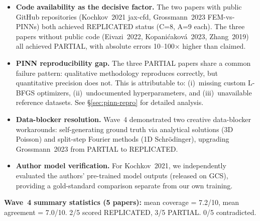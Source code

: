 \begin{itemize}
\item \textbf{Code availability as the decisive factor.} The two papers with
  public GitHub repositories (Kochkov~2021 jax-cfd, Grossmann~2023
  FEM-vs-PINNs) both achieved REPLICATED status (C=8, A=9 each). The three
  papers without public code (Eivazi~2022, Kopani\'cakov\'a~2023,
  Zhang~2019) all achieved PARTIAL, with absolute errors 10--100$\times$
  higher than claimed.
\item \textbf{PINN reproducibility gap.} The three PARTIAL papers share a
  common failure pattern: qualitative methodology reproduces correctly, but
  quantitative precision does not. This is attributable to: (i)~missing
  custom L-BFGS optimizers, (ii)~undocumented hyperparameters, and
  (iii)~unavailable reference datasets. See \S\ref{sec:pinn-repro} for
  detailed analysis.
\item \textbf{Data-blocker resolution.} Wave~4 demonstrated two creative
  data-blocker workarounds: self-generating ground truth via analytical
  solutions (3D Poisson) and split-step Fourier methods (1D Schr\"odinger),
  upgrading Grossmann~2023 from PARTIAL to REPLICATED.
\item \textbf{Author model verification.} For Kochkov~2021, we independently
  evaluated the authors' pre-trained model outputs (released on GCS),
  providing a gold-standard comparison separate from our own training.
\end{itemize}

\noindent\textbf{Wave~4 summary statistics (5 papers):}
mean coverage = 7.2/10, mean agreement = 7.0/10.
2/5 scored REPLICATED, 3/5 PARTIAL.
0/5 contradicted.

